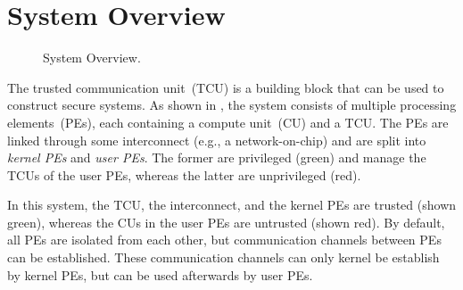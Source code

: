 \chapter{System Overview}
\label{sec:systemoverview}

\newcommand{\fillpe}[3]{
    \node[below=.6em of #1.north] {#2};
    \node[cu, above right=.6em and .6em of #1.south west,#3] (cu1) {CU};
    \node[tcu,above left=.6em and .6em of #1.south east,#3] (tcu1) {TCU};

    \draw[noc] ($(#1.south west)-(0,1.0em)$) -- ($(pe3.south east)-(0,1.0em)$);
    \draw[noc] ($(#1.south west)-(0,1.2em)$) -- ($(pe3.south east)-(0,1.2em)$);
    \draw[noc] ($(#1.south west)-(0,1.4em)$) -- ($(pe3.south east)-(0,1.4em)$);

    \draw
      let \p1=(tcu1.south), \p2=($(#1.south west)-(0,1.2em)$) in
      (tcu1.south) -- (\x1, \y2);
    \fill[radius=.2em]
      let \p1=(tcu1.south), \p2=($(#1.south west)-(0,1.2em)$) in
      (\x1, \y2) circle node {};
}

\begin{figure}[h]
  \center
  \caption{System Overview.}
  \label{fig:sysoverview}
\end{figure}

\noindent The trusted communication unit~(TCU) is a building block that can be used to construct
secure systems. As shown in , the system consists of multiple processing
elements~(PEs), each containing a compute unit~(CU) and a TCU. The PEs are linked through some
interconnect (e.g., a network-on-chip) and are split into \emph{kernel PEs} and \emph{user PEs}. The
former are privileged (green) and manage the TCUs of the user PEs, whereas the latter are
unprivileged (red).

In this system, the TCU, the interconnect, and the kernel PEs are trusted (shown green), whereas the
CUs in the user PEs are untrusted (shown red). By default, all PEs are isolated from each other, but
communication channels between PEs can be established. These communication channels can only kernel
be establish by kernel PEs, but can be used afterwards by user PEs.

